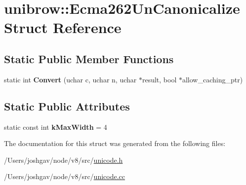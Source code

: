 \hypertarget{structunibrow_1_1_ecma262_un_canonicalize}{}\section{unibrow\+:\+:Ecma262\+Un\+Canonicalize Struct Reference}
\label{structunibrow_1_1_ecma262_un_canonicalize}
\subsection*{Static Public Member Functions}
\begin{DoxyCompactItemize}
\item 
static int {\bfseries Convert} (uchar c, uchar n, uchar $\ast$result, bool $\ast$allow\+\_\+caching\+\_\+ptr)\hypertarget{structunibrow_1_1_ecma262_un_canonicalize_a1740c097b65e6f7d1f191460d140b8b0}{}\label{structunibrow_1_1_ecma262_un_canonicalize_a1740c097b65e6f7d1f191460d140b8b0}

\end{DoxyCompactItemize}
\subsection*{Static Public Attributes}
\begin{DoxyCompactItemize}
\item 
static const int {\bfseries k\+Max\+Width} = 4\hypertarget{structunibrow_1_1_ecma262_un_canonicalize_a3c53472528136e8a9e0d10ac29ee2456}{}\label{structunibrow_1_1_ecma262_un_canonicalize_a3c53472528136e8a9e0d10ac29ee2456}

\end{DoxyCompactItemize}


The documentation for this struct was generated from the following files\+:\begin{DoxyCompactItemize}
\item 
/\+Users/joshgav/node/v8/src/\hyperlink{unicode_8h}{unicode.\+h}\item 
/\+Users/joshgav/node/v8/src/\hyperlink{unicode_8cc}{unicode.\+cc}\end{DoxyCompactItemize}
